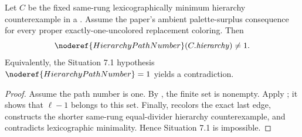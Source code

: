 \begin{lemma}
Let \(C\) be the fixed same-rung lexicographically minimum hierarchy
counterexample in a
.  Assume the paper's
ambient palette-surplus consequence for every proper
exactly-one-uncolored replacement coloring.  Then
\[
 \noderef{HierarchyPathNumber}(C.\mathit{hierarchy})\ne1.
\]
Equivalently, the Situation 7.1 hypothesis
\(\noderef{HierarchyPathNumber}=1\) yields a contradiction.
\end{lemma}
\begin{proof}
Assume the path number is one.  By , the
finite set  is nonempty.
Apply ; it shows
that \(\ell-1\) belongs to this set.  Finally,
 recolors the exact
last edge, constructs the shorter same-rung equal-divider hierarchy
counterexample, and contradicts lexicographic minimality.  Hence Situation
7.1 is impossible.
\end{proof}
